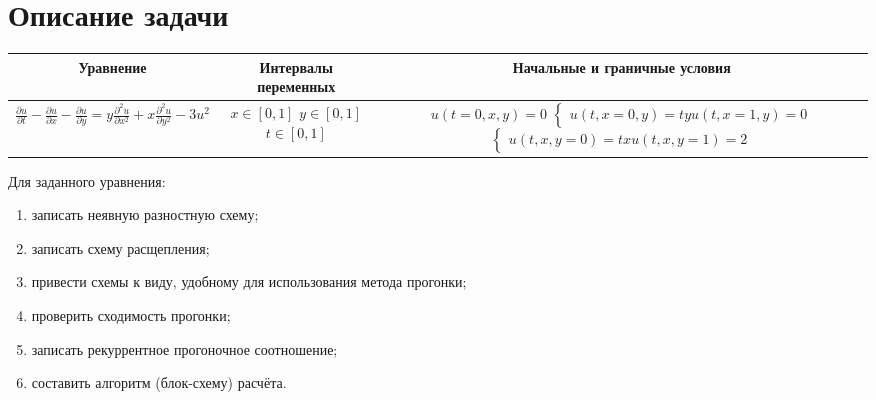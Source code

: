 \documentclass[12pt, a4paper]{report}
\begin{document}
	\section*{Описание задачи}
	\large
	\begin{center}
		\begin{tabular}{||c|c|c||}
			\hline
			Уравнение & \makecell{Интервалы \\ переменных} & Начальные и граничные условия \\

			\hline
			\small 
			$ \frac{\partial u}{\partial t} - \frac{\partial u}{\partial x} - \frac{\partial u}{\partial y} = y\frac{\partial^{2} u}{\partial x^{2}} + x\frac{\partial^{2} u}{\partial y^{2}} - 3u^{2} $ & \makecell{$ x \in [0, 1] $ \\ $ y \in [0, 1] $ \\ $ t \in [0, 1] $} & \makecell{$ u(t = 0, x, y) = 0 $ \\ $\begin{cases} u(t, x = 0, y) = ty \\ u(t, x = 1, y) = 0 \end{cases}$ \\ $\begin{cases} u(t, x, y = 0) = tx \\ u(t, x, y = 1) = 2 \end{cases}$} \\

			\hline
		\end{tabular}
	\end{center}

	Для заданного уравнения:
	\begin{enumerate}
		\item записать неявную разностную схему;
		\item записать схему расщепления;
		\item привести схемы к виду, удобному для использования метода прогонки;
		\item проверить сходимость прогонки;
		\item записать рекуррентное прогоночное соотношение;
		\item составить алгоритм (блок-схему) расчёта.
	\end{enumerate}
\end{document}
